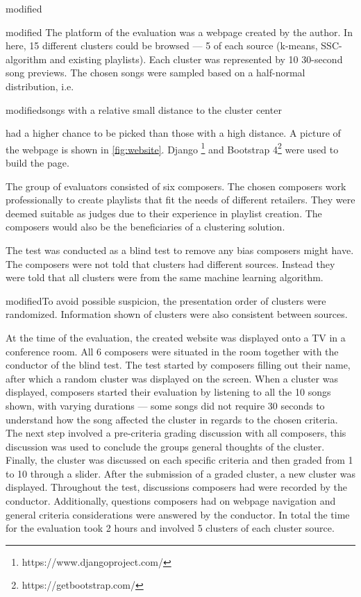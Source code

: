 \documentclass[../report.tex]{subfiles}
\begin{document}
\begin{color}{modified}
\begin{color}{modified}
The platform of the evaluation was a webpage created by the author. In here, 15 different clusters could be browsed --- 5 of each source (k-means, SSC-algorithm and existing playlists). Each cluster was represented by 10 30-second song previews. The chosen songs were sampled based on a half-normal distribution, i.e. \begin{color}{modified}songs with a relative small distance to the cluster center \end{color} had a higher chance to be picked than those with a high distance. A picture of the webpage is shown in \cref{fig:website}. Django \footnote{https://www.djangoproject.com/} and Bootstrap 4\footnote{https://getbootstrap.com/} were used to build the page.

The group of evaluators consisted of six composers. The chosen composers work professionally to create playlists that fit the needs of different retailers. They were deemed suitable as judges due to their experience in playlist creation. The composers would also be the beneficiaries of a clustering solution.\end{color}

The test was conducted as a blind test to remove any bias composers might have. The composers were not told that clusters had different sources. Instead they were told that all clusters were from the same machine learning algorithm. \begin{color}{modified}To avoid possible suspicion, the presentation order of clusters were randomized. Information shown of clusters were also consistent between sources.\end{color}

At the time of the evaluation, the created website was displayed onto a TV in a conference room. All 6 composers were situated in the room together with the conductor of the blind test. The test started by composers filling out their name, after which a random cluster was displayed on the screen. When a cluster was displayed, composers started their evaluation by listening to all the 10 songs shown, with varying durations --- some songs did not require 30 seconds to understand how the song affected the cluster in regards to the chosen criteria. The next step involved a pre-criteria grading discussion with all composers, this discussion was used to conclude the groups general thoughts of the cluster. Finally, the cluster was discussed on each specific criteria and then graded from 1 to 10 through a slider. After the submission of a graded cluster, a new cluster was displayed. Throughout the test, discussions composers had were recorded by the conductor. Additionally, questions composers had on webpage navigation and general criteria considerations were answered by the conductor. In total the time for the evaluation took 2 hours and involved 5 clusters of each cluster source.



\end{color}
\end{document}
